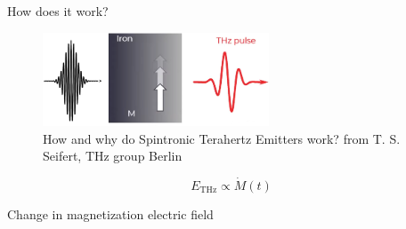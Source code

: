 \documentclass[aspectratio=1610, 9pt]{beamer}
\begin{document}
\begin{frame}{How does it work?}
  \begin{center}
    \begin{figure}
    \caption{\textcolor{tugreen}{How and why do Spintronic Terahertz Emitters work?} from T. S. Seifert, THz group Berlin}
    \vspace{0.3in}
    \includegraphics[width=0.6\textwidth]{pics/quenching.png}
    \end{figure}
  \end{center}
  \begin{equation*}
    E_\text{THz} \propto \dot{M}(t)
  \end{equation*}
  \begin{center}
    \Large Change in magnetization \rightarrow electric field
  \end{center}
\end{frame}
\end{document}
